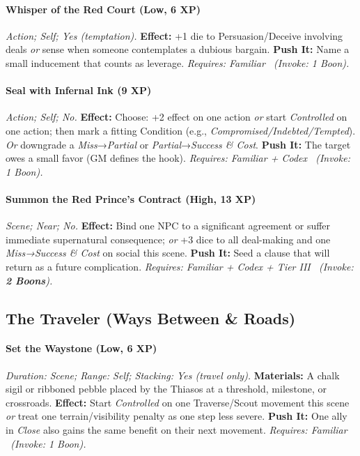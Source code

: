 \documentclass[12pt,twoside]{book}
\begin{document}
\paragraph{Whisper of the Red Court (Low, 6 XP)} \emph{Action; Self; Yes (temptation).}
\textbf{Effect:} +1 die to Persuasion/Deceive involving deals \emph{or} sense when someone contemplates a dubious bargain.
\textbf{Push It:} Name a small inducement that counts as leverage.
\emph{Requires: Familiar \ (\textit{Invoke:} 1 Boon).}
\paragraph{Seal with Infernal Ink (9 XP)} \emph{Action; Self; No.}
\textbf{Effect:} Choose: +2 effect on one action \emph{or} start \emph{Controlled} on one action; then mark a fitting Condition (e.g., \emph{Compromised/Indebted/Tempted}). \emph{Or} downgrade a \emph{Miss}→\emph{Partial} or \emph{Partial}→\emph{Success \& Cost}.
\textbf{Push It:} The target owes a small favor (GM defines the hook).
\emph{Requires: Familiar + Codex \ (\textit{Invoke:} 1 Boon).}
\paragraph{Summon the Red Prince’s Contract (High, 13 XP)} \emph{Scene; Near; No.}
\textbf{Effect:} Bind one NPC to a significant agreement or suffer immediate supernatural consequence; \emph{or} +3 dice to all deal-making and one \emph{Miss→Success \& Cost} on social this scene.
\textbf{Push It:} Seed a clause that will return as a future complication.
\emph{Requires: Familiar + Codex + Tier III \ (\textit{Invoke:} \textbf{2 Boons}).}

\subsection{The Traveler (Ways Between \& Roads)}

\paragraph{Set the Waystone (Low, 6 XP)} \emph{Duration: Scene; Range: Self; Stacking: Yes (travel only).}
\textbf{Materials:} A chalk sigil or ribboned pebble placed by the Thiasos at a threshold, milestone, or crossroads.
\textbf{Effect:} Start \emph{Controlled} on one Traverse/Scout movement this scene \emph{or} treat one terrain/visibility penalty as one step less severe. 
\textbf{Push It:} One ally in \emph{Close} also gains the same benefit on their next movement.
\emph{Requires: Familiar \ (\textit{Invoke:} 1 Boon).}
\end{document}
